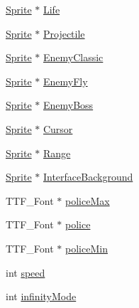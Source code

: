\begin{DoxyCompactItemize}
\item 
\hyperlink{struct_sprite}{Sprite} $\ast$ \hyperlink{structsdl_map_aa53b862554a932ba9344ec8c92483bca}{Life}
\item 
\hyperlink{struct_sprite}{Sprite} $\ast$ \hyperlink{structsdl_map_a6548a3f2c7badec102f4f1c8e735d476}{Projectile}
\item 
\hyperlink{struct_sprite}{Sprite} $\ast$ \hyperlink{structsdl_map_a5dc535d0f63b57bbcc90a0b97ba78717}{Enemy\-Classic}
\item 
\hyperlink{struct_sprite}{Sprite} $\ast$ \hyperlink{structsdl_map_a894d4ebdb480c9e9fe57ad0cf0ed02f2}{Enemy\-Fly}
\item 
\hyperlink{struct_sprite}{Sprite} $\ast$ \hyperlink{structsdl_map_ac1a797b044af2a0f43862dc77973a668}{Enemy\-Boss}
\item 
\hyperlink{struct_sprite}{Sprite} $\ast$ \hyperlink{structsdl_map_a236dd04a2df7f7f7206f8021efef2569}{Cursor}
\item 
\hyperlink{struct_sprite}{Sprite} $\ast$ \hyperlink{structsdl_map_a8c80e7ab9d667f3fed257e740c127754}{Range}
\item 
\hyperlink{struct_sprite}{Sprite} $\ast$ \hyperlink{structsdl_map_aa1020fa93135fd48a6621598ae62be64}{Interface\-Background}
\item 
T\-T\-F\-\_\-\-Font $\ast$ \hyperlink{structsdl_map_a15a6dfd7a5854e7d99d49cabcb2b42a2}{police\-Max}
\item 
T\-T\-F\-\_\-\-Font $\ast$ \hyperlink{structsdl_map_a79fc8a90bb1543b634696c4ecc724fff}{police}
\item 
T\-T\-F\-\_\-\-Font $\ast$ \hyperlink{structsdl_map_aa40797238dd8d6307fff78b65c2c1d54}{police\-Min}
\item 
int \hyperlink{structsdl_map_a16d791a447f9fcc7d5a194aba72a4798}{speed}
\item 
int \hyperlink{structsdl_map_a2951a38d01edee04c9137f321e237728}{infinity\-Mode}
\end{DoxyCompactItemize}


